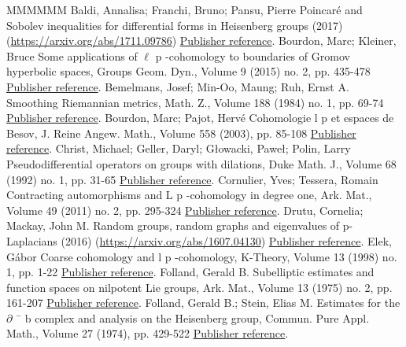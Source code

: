\documentclass[11pt]{article}
\theoremstyle{definition}
\numberwithin{equation}{section}
\numberwithin{figure}{section}
\numberwithin{table}{section}
\begin{document}
\begin{thebibliography}{MMMMMM}
 Baldi, Annalisa; Franchi, Bruno; Pansu, Pierre Poincaré and Sobolev inequalities for differential forms in Heisenberg groups (2017) (\url{https://arxiv.org/abs/1711.09786}) \href{https://ahl.centre-mersenne.org/item/AHL_2018__1__267_0/#BFP}{Publisher reference}.
 Bourdon, Marc; Kleiner, Bruce Some applications of \(\ell\) p -cohomology to boundaries of Gromov hyperbolic spaces, Groups Geom. Dyn., Volume 9 (2015) no. 2, pp. 435-478 \href{https://ahl.centre-mersenne.org/item/AHL_2018__1__267_0/#Bourdon-Kleiner}{Publisher reference}.
 Bemelmans, Josef; Min-Oo, Maung; Ruh, Ernst A. Smoothing Riemannian metrics, Math. Z., Volume 188 (1984) no. 1, pp. 69-74 \href{https://ahl.centre-mersenne.org/item/AHL_2018__1__267_0/#B-MinOo-Ruh}{Publisher reference}.
 Bourdon, Marc; Pajot, Hervé Cohomologie l p  et espaces de Besov, J. Reine Angew. Math., Volume 558 (2003), pp. 85-108 \href{https://ahl.centre-mersenne.org/item/AHL_2018__1__267_0/#Bourdon-Pajot}{Publisher reference}.
 Christ, Michael; Geller, Daryl; Głowacki, Paweł; Polin, Larry Pseudodifferential operators on groups with dilations, Duke Math. J., Volume 68 (1992) no. 1, pp. 31-65 \href{https://ahl.centre-mersenne.org/item/AHL_2018__1__267_0/#CGGP}{Publisher reference}.
 Cornulier, Yves; Tessera, Romain Contracting automorphisms and L p -cohomology in degree one, Ark. Mat., Volume 49 (2011) no. 2, pp. 295-324 \href{https://ahl.centre-mersenne.org/item/AHL_2018__1__267_0/#Cornulier-Tessera}{Publisher reference}.
 Drutu, Cornelia; Mackay, John M. Random groups, random graphs and eigenvalues of p-Laplacians (2016) (\url{https://arxiv.org/abs/1607.04130}) \href{https://ahl.centre-mersenne.org/item/AHL_2018__1__267_0/#Drutu-Mackay}{Publisher reference}.
 Elek, Gábor Coarse cohomology and l p -cohomology, K-Theory, Volume 13 (1998) no. 1, pp. 1-22 \href{https://ahl.centre-mersenne.org/item/AHL_2018__1__267_0/#Elek}{Publisher reference}.
 Folland, Gerald B. Subelliptic estimates and function spaces on nilpotent Lie groups, Ark. Mat., Volume 13 (1975) no. 2, pp. 161-207 \href{https://ahl.centre-mersenne.org/item/AHL_2018__1__267_0/#Folland_1975}{Publisher reference}.
 Folland, Gerald B.; Stein, Elias M. Estimates for the \(\partial\) ¯ b  complex and analysis on the Heisenberg group, Commun. Pure Appl. Math., Volume 27 (1974), pp. 429-522 \href{https://ahl.centre-mersenne.org/item/AHL_2018__1__267_0/#FollandStein}{Publisher reference}.

\end{thebibliography}
\end{document}
